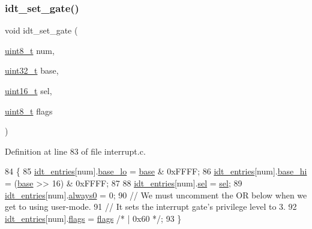 \subsubsection{\texorpdfstring{idt\+\_\+set\+\_\+gate()}{idt\_set\_gate()}}
{\footnotesize\ttfamily void idt\+\_\+set\+\_\+gate (\begin{DoxyParamCaption}\item[{\hyperlink{a00140_aba7bc1797add20fe3efdf37ced1182c5_aba7bc1797add20fe3efdf37ced1182c5}{uint8\+\_\+t}}]{num,  }\item[{\hyperlink{a00140_a435d1572bf3f880d55459d9805097f62_a435d1572bf3f880d55459d9805097f62}{uint32\+\_\+t}}]{base,  }\item[{\hyperlink{a00140_a273cf69d639a59973b6019625df33e30_a273cf69d639a59973b6019625df33e30}{uint16\+\_\+t}}]{sel,  }\item[{\hyperlink{a00140_aba7bc1797add20fe3efdf37ced1182c5_aba7bc1797add20fe3efdf37ced1182c5}{uint8\+\_\+t}}]{flags }\end{DoxyParamCaption})}



Definition at line 83 of file interrupt.\+c.


\begin{DoxyCode}
84 \{
85     \hyperlink{a00110_a02c62ffc54da283f5faaa40b125d2dce_a02c62ffc54da283f5faaa40b125d2dce}{idt\_entries}[num].\hyperlink{a00240_a4b5fce0881deb4959d33da77d1ed0202_a4b5fce0881deb4959d33da77d1ed0202}{base\_lo} = \hyperlink{a00104_a0523cedff47e2441fc198b7770ec5d3f_a0523cedff47e2441fc198b7770ec5d3f}{base} & 0xFFFF;
86     \hyperlink{a00110_a02c62ffc54da283f5faaa40b125d2dce_a02c62ffc54da283f5faaa40b125d2dce}{idt\_entries}[num].\hyperlink{a00240_af46adb2603d1d8b4a3bedf7f1c6daed4_af46adb2603d1d8b4a3bedf7f1c6daed4}{base\_hi} = (\hyperlink{a00104_a0523cedff47e2441fc198b7770ec5d3f_a0523cedff47e2441fc198b7770ec5d3f}{base} >> 16) & 0xFFFF;
87 
88     \hyperlink{a00110_a02c62ffc54da283f5faaa40b125d2dce_a02c62ffc54da283f5faaa40b125d2dce}{idt\_entries}[num].\hyperlink{a00240_a3c9321c263139e56901a05efee220047_a3c9321c263139e56901a05efee220047}{sel}     = \hyperlink{a00110_af0b0a7e10694e3b600c7561311cc8271_af0b0a7e10694e3b600c7561311cc8271}{sel};
89     \hyperlink{a00110_a02c62ffc54da283f5faaa40b125d2dce_a02c62ffc54da283f5faaa40b125d2dce}{idt\_entries}[num].\hyperlink{a00240_adc747b3ff87142c71b7b8c51e03c067c_adc747b3ff87142c71b7b8c51e03c067c}{always0} = 0;
90     \textcolor{comment}{// We must uncomment the OR below when we get to using user-mode.}
91     \textcolor{comment}{// It sets the interrupt gate's privilege level to 3.}
92     \hyperlink{a00110_a02c62ffc54da283f5faaa40b125d2dce_a02c62ffc54da283f5faaa40b125d2dce}{idt\_entries}[num].\hyperlink{a00240_a02277c77564820972ae5df0a37c80be0_a02277c77564820972ae5df0a37c80be0}{flags}   = \hyperlink{a00110_aa2585d779da0ab21273a8d92de9a0ebe_aa2585d779da0ab21273a8d92de9a0ebe}{flags} \textcolor{comment}{/* | 0x60 */};
93 \}
\end{DoxyCode}
\mbox{\label{a00107_a35fe413107af682030ab7a4b6dff19b8_a35fe413107af682030ab7a4b6dff19b8}} 
